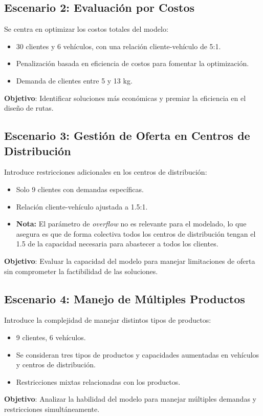 \documentclass[12pt]{article}
\begin{document}
\subsection{Escenario 2: Evaluación por Costos}
Se centra en optimizar los costos totales del modelo:
\begin{itemize}
    \item 30 clientes y 6 vehículos, con una relación cliente-vehículo de 5:1.
    \item Penalización basada en eficiencia de costos para fomentar la optimización.
    \item Demanda de clientes entre 5 y 13 kg.
\end{itemize}
\textbf{Objetivo}: Identificar soluciones más económicas y premiar la eficiencia en el diseño de rutas.

\subsection{Escenario 3: Gestión de Oferta en Centros de Distribución}
Introduce restricciones adicionales en los centros de distribución:
\begin{itemize}
    \item Solo 9 clientes con demandas específicas.
    \item Relación cliente-vehículo ajustada a 1.5:1.
    \item \textbf{Nota:} El parámetro de \textit{overflow} no es relevante para el modelado, lo que asegura es que de forma colectiva todos los centros de distribución tengan el 1.5 de la capacidad necesaria para abastecer a todos los clientes.
\end{itemize}
\textbf{Objetivo}: Evaluar la capacidad del modelo para manejar limitaciones de oferta sin comprometer la factibilidad de las soluciones.

\subsection{Escenario 4: Manejo de Múltiples Productos}
Introduce la complejidad de manejar distintos tipos de productos:
\begin{itemize}
    \item 9 clientes, 6 vehículos.
    \item Se consideran tres tipos de productos y capacidades aumentadas en vehículos y centros de distribución.
    \item Restricciones mixtas relacionadas con los productos.
\end{itemize}
\textbf{Objetivo}: Analizar la habilidad del modelo para manejar múltiples demandas y restricciones simultáneamente.
\end{document}
